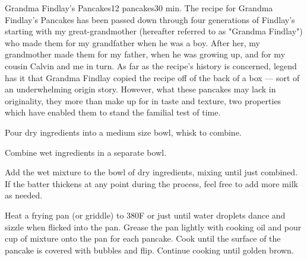 \begin{recipe}{Grandma Findlay's Pancakes}{12 pancakes}{30 min.}
\freeform The recipe for Grandma Findlay's Pancakes has been passed down through
four generations of Findlay's starting with my great-grandmother (hereafter
referred to as "Grandma Findlay") who made them for my grandfather when he was
a boy. After her, my grandmother made them for my father, when he was growing
up, and for my cousin Calvin and me in turn. As far as the recipe's history is
concerned, legend has it that Grandma Findlay copied the recipe off of the back
of a box --- sort of an underwhelming origin story. However, what these pancakes
may lack in originality, they more than make up for in taste and texture, two
properties which have enabled them to stand the familial test of time.

Pour dry ingredients into a medium size bowl, whisk to combine.

Combine wet ingredients in a separate bowl.

\newstep Add the wet mixture to the bowl of dry ingredients, mixing until just
combined.  If the batter thickens at any point during the process, feel free to
add more milk as needed.

\newstep Heat a frying pan (or griddle) to 380\0F or just until water droplets
dance and sizzle when flicked into the pan.  Grease the pan lightly with cooking
oil and pour  cup of mixture onto the pan for each pancake. Cook until
the surface of the pancake is covered with bubbles and flip. Continue cooking
until golden brown.
\end{recipe}

